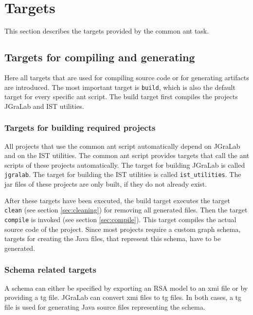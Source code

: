 \documentclass[a4paper,twoside,11pt,bibtotoc]{article}
\begin{document}
\section{Targets}
\label{sec:targets}
This section describes the targets provided by the common ant task.

\subsection{Targets for compiling and generating}
\label{sec:creating}
Here all targets that are used for compiling source code or for generating artifacts are introduced.
The most important target is \texttt{build}, which is also the default target for every specific ant script.
The build target first compiles the projects JGraLab and IST utilities.

\subsubsection{Targets for building required projects}
\label{sec:required}
All projects that use the common ant script automatically depend on JGraLab and on the IST utilities.
The common ant script provides targets that call the ant scripts of these projects automatically.
The target for building JGraLab is called \texttt{jgralab}.
The target for building the IST utilities is called \texttt{ist\_utilities}.
The jar files of these projects are only built, if they do not already exist.

After these targets have been executed, the build target executes the target \texttt{clean} (see section \ref{sec:cleaning}) for removing all generated files.
Then the target \texttt{compile} is invoked (see section \ref{sec:compile}).
This target compiles the actual source code of the project.
Since most projects require a custom graph schema, targets for creating the Java files, that represent this schema, have to be generated.

\subsubsection*{Schema related targets}
A schema can either be specified by exporting an RSA model to an xmi file or by providing a tg file.
JGraLab can convert xmi files to tg files.
In both cases, a tg file is used for generating Java source files representing the schema.
\end{document}
